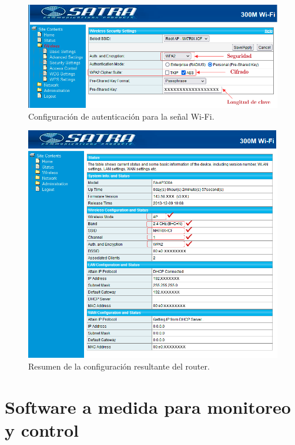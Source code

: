 \begin{figure}[htpb]
\centering 
\includegraphics[width=1.0\textwidth]{./Figures/encriptacion.png}
\caption{Configuración de autenticación para la señal Wi-Fi.}
\label{fig:encriptacion}
\end{figure}
\begin{figure}[htpb]
\centering 
\includegraphics[width=1.0\textwidth]{./Figures/configuracionfinal.png}
\caption{Resumen de la configuración resultante del router.}
\label{fig:configuracionfinal}
\end{figure}

\section{Software a medida para monitoreo y control}

